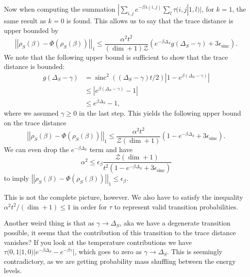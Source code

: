 \documentclass{article}
\newcommand{\abs}[1]{\left| #1 \right|}
\newcommand{\norm}[1]{\left| \left| #1 \right| \right|}
\newcommand{\partfun}{\mathcal{Z}}
\DeclareMathOperator{\sinc}{sinc}
\begin{document}
    Now when computing the summation $|\sum_{i,j} e^{-\beta \lambda(i,j)} \sum_l \tau(i,j |1,l)|$, for $k=1$, the same result as $k=0$ is found. This allows us to say that the trace distance is upper bounded by
    \begin{equation}
        \norm{\rho_S(\beta) - \Phi(\rho_S(\beta))}_1 \leq \frac{\alpha^2 t^2}{(\dim + 1)\partfun} (e^{-\beta \Delta_S} g(\Delta_S - \gamma) + 3 \epsilon_{\sinc}).
    \end{equation}
    We note that the following upper bound is sufficient to show that the trace distance is bounded:
    \begin{align}
        g(\Delta_S - \gamma) &= \sinc^2((\Delta_S - \gamma)t/2) \abs{1 - e^{\beta(\Delta_S - \gamma)}} \\
        &\leq \abs{e^{\beta(\Delta_S - \gamma)} - 1} \\
        &\leq e^{\beta \Delta_S} - 1,
    \end{align}
    where we assumed $\gamma \geq 0$ in the last step. This yields the following upper bound on the trace distance
    \begin{equation}
        \norm{\rho_S(\beta) - \Phi(\rho_S(\beta))}_1 \leq \frac{\alpha^2 t^2}{\partfun (\dim+1)} (1 - e^{-\beta \Delta_S} + 3 \epsilon_{\sinc}).
    \end{equation}
    We can even drop the $e^{-\beta \Delta_S}$ term and have 
    $$\alpha^2 \leq \epsilon_{\beta} \frac{ \partfun (\dim + 1)}{t^2 (1 - e^{-\beta \Delta_S} + 3 \epsilon_{\sinc})}$$
    to imply $\norm{\rho_S(\beta) - \Phi(\rho_S(\beta))}_1 \leq \epsilon_{\beta}$.

    This is not the complete picture, however. We also have to satisfy the inequality $\alpha^2 t^2 / (\dim + 1) \leq 1$ in order for $\tau$ to represent valid transition probabilities. 


    Another weird thing is that as $\gamma \to \Delta_S$, aka we have a degenerate transition possible, it seems that the contribution of this transition to the trace distance vanishes? If you look at the temperature contributions we have $\tau(0,1|1,0)|e^{-\beta \Delta_S} - e^{-\beta \gamma}|$, which goes to zero as $\gamma \to \Delta_S$. This is seemingly contradictory, as we are getting probability mass shuffling between the energy levels. 
    
\end{document}
